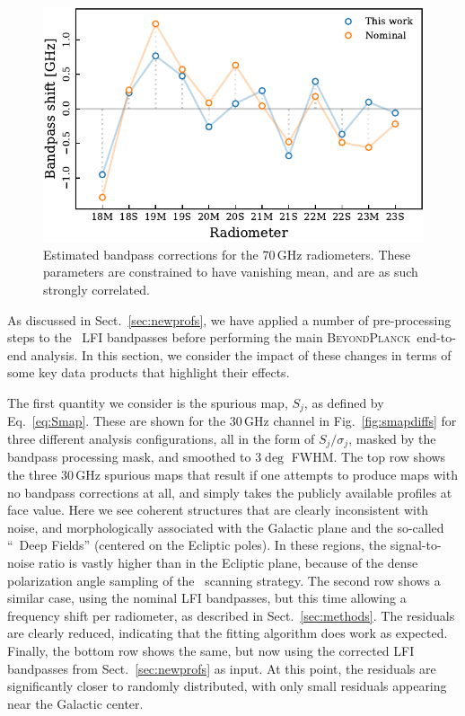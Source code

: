 \documentclass[twocolumn]{aa}
\newcommand{\BP}{\textsc{BeyondPlanck}}
\newcommand{\?}[1]{\textcolor{red}{{\bf [#1]}}}
\begin{document}
  
  \begin{figure}
    \center
    \includegraphics[width=\linewidth]{figs/bpshifts_70comparison2.pdf}
    \caption{Estimated bandpass corrections for the 70\,GHz radiometers. These parameters are constrained to have vanishing mean, and are as such strongly correlated.}
    \label{fig:bpshift70}
  \end{figure}

As discussed in Sect.~\ref{sec:newprofs}, we have applied a number of
pre-processing steps to the \Planck\ LFI bandpasses before performing
the main \BP\ end-to-end analysis. In this section, we consider the
impact of these changes in terms of some key data products that
highlight their effects.

The first quantity we consider is the spurious map, $S_j$, as defined by
Eq.~\eqref{eq:Smap}. These are shown for the 30\,GHz channel in
Fig.~\ref{fig:smapdiffs} for three different analysis configurations, all in the
form of $S_j/\sigma_j$, masked by the bandpass processing mask, and smoothed to
$3\deg$ FWHM. The top row shows the three 30\,GHz spurious maps that result if
one attempts to produce maps with no bandpass corrections at all, and simply
takes the publicly available profiles at face value. Here we see coherent
structures that are clearly inconsistent with noise, and morphologically
associated with the Galactic plane and the so-called ``\Planck\ Deep Fields''
(centered on the Ecliptic poles). In these regions, the signal-to-noise
ratio is vastly higher than in the Ecliptic plane, because of the dense
polarization angle sampling of the \Planck\ scanning strategy. The second row
shows a similar case, using the nominal LFI bandpasses, but this time allowing a
frequency shift per radiometer, as described in Sect.~\ref{sec:methods}. The
residuals are clearly reduced, indicating that the fitting algorithm does work
as expected. Finally, the bottom row shows the same, but now using the corrected
LFI bandpasses from Sect.~\ref{sec:newprofs} as input. At this point, the
residuals are significantly closer to randomly distributed, with only small
residuals appearing near the Galactic center.
\end{document}
